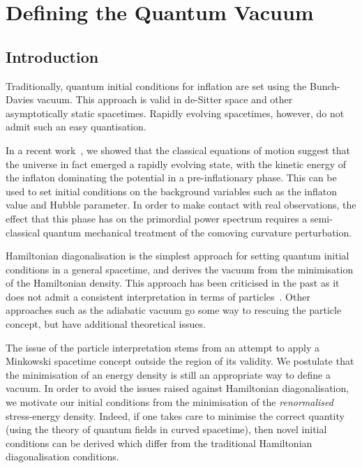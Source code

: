 
\chapter{Defining the Quantum Vacuum}
\label{chap:qv}


\section{Introduction}
\label{sec:introduction}
Traditionally, quantum initial conditions for inflation are set using the Bunch-Davies vacuum. This approach is valid in de-Sitter space and other asymptotically static spacetimes. Rapidly evolving spacetimes, however, do not admit such an easy quantisation. 

In a recent work~\cite{Handley+2014}, we showed that the classical equations of motion suggest that the universe in fact emerged a rapidly evolving state, with the kinetic energy of the inflaton dominating the potential in a pre-inflationary phase. 
This can be used to set initial conditions on the background variables such as the inflaton value and Hubble parameter. 
In order to make contact with real observations, the effect that this phase has on the primordial power spectrum requires a semi-classical quantum mechanical treatment of the comoving curvature perturbation.

Hamiltonian diagonalisation is the simplest approach for setting quantum initial conditions in a general spacetime, and derives the vacuum from the minimisation of the Hamiltonian density. This approach has been criticised in the past as it does not admit a consistent interpretation in terms of particles~\cite{Fulling+1989,Fulling_HD}. Other approaches such as the adiabatic vacuum go some way to rescuing the particle concept, but have additional theoretical issues. 

The issue of the particle interpretation stems from an attempt to apply a Minkowski spacetime concept outside the region of its validity.  
We postulate that the minimisation of an energy density is still an appropriate way to define a vacuum. In order to avoid the issues raised against Hamiltonian diagonalisation, we motivate our initial conditions from the minimisation of the {\em renormalised\/} stress-energy density. 
Indeed, if one takes care to minimise the correct quantity (using the theory of quantum fields in curved spacetime), then novel initial conditions can be derived which differ from the traditional Hamiltonian diagonalisation conditions.

